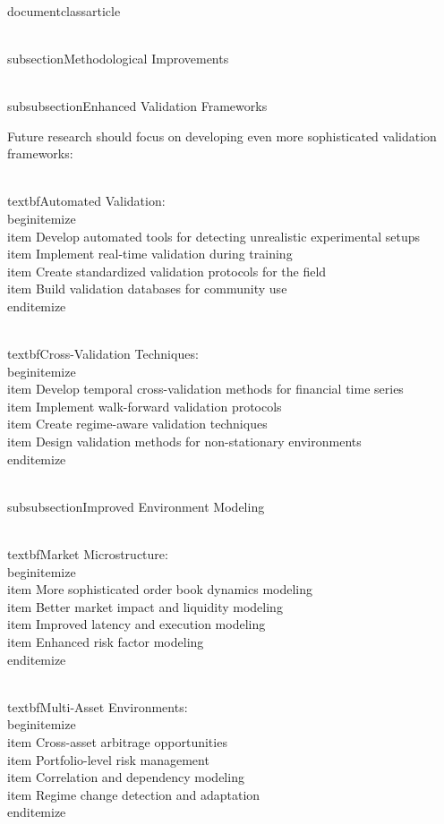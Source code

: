 \\documentclass{article}
\begin{document}
\\subsection{Methodological Improvements}

\\subsubsection{Enhanced Validation Frameworks}

Future research should focus on developing even more sophisticated validation frameworks:

\\textbf{Automated Validation}:
\\begin{itemize}
\\item Develop automated tools for detecting unrealistic experimental setups
\\item Implement real-time validation during training
\\item Create standardized validation protocols for the field
\\item Build validation databases for community use
\\end{itemize}

\\textbf{Cross-Validation Techniques}:
\\begin{itemize}
\\item Develop temporal cross-validation methods for financial time series
\\item Implement walk-forward validation protocols
\\item Create regime-aware validation techniques
\\item Design validation methods for non-stationary environments
\\end{itemize}

\\subsubsection{Improved Environment Modeling}

\\textbf{Market Microstructure}:
\\begin{itemize}
\\item More sophisticated order book dynamics modeling
\\item Better market impact and liquidity modeling
\\item Improved latency and execution modeling
\\item Enhanced risk factor modeling
\\end{itemize}

\\textbf{Multi-Asset Environments}:
\\begin{itemize}
\\item Cross-asset arbitrage opportunities
\\item Portfolio-level risk management
\\item Correlation and dependency modeling
\\item Regime change detection and adaptation
\\end{itemize}
\end{document}
